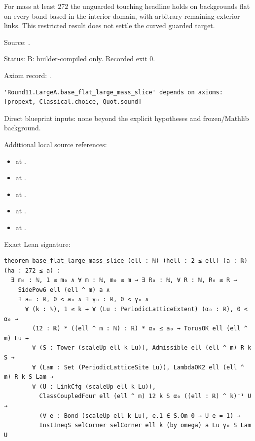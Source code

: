 \begin{theorem}[bp-238]
\label{bp-238}
\uses{}
\leanok
For mass at least 272 the unguarded touching headline holds on backgrounds flat on every bond based in the interior domain, with arbitrary remaining exterior links. This restricted result does not settle the curved guarded target.

\par Source: \texttt{}.
\par Status: B: builder-compiled only. Recorded exit 0.
\par Axiom record: \texttt{}.
\begin{verbatim}
'Round11.LargeA.base_flat_large_mass_slice' depends on axioms: [propext, Classical.choice, Quot.sound]
\end{verbatim}
\par Direct blueprint inputs: none beyond the explicit hypotheses and frozen/Mathlib background.
\par Additional local source references:
\begin{itemize}
\item \texttt{} at \texttt{}.
\item \texttt{} at \texttt{}.
\item \texttt{} at \texttt{}.
\item \texttt{} at \texttt{}.
\item \texttt{} at \texttt{}.
\end{itemize}
\par Exact Lean signature:
\begin{verbatim}
theorem base_flat_large_mass_slice (ell : ℕ) (hell : 2 ≤ ell) (a : ℝ) (ha : 272 ≤ a) :
  ∃ m₀ : ℕ, 1 ≤ m₀ ∧ ∀ m : ℕ, m₀ ≤ m → ∃ R₀ : ℕ, ∀ R : ℕ, R₀ ≤ R →
    SidePow6 ell (ell ^ m) a ∧
    ∃ a₀ : ℝ, 0 < a₀ ∧ ∃ γ₀ : ℝ, 0 < γ₀ ∧
      ∀ (k : ℕ), 1 ≤ k → ∀ (Lu : PeriodicLatticeExtent) (α₀ : ℝ), 0 < α₀ →
        (12 : ℝ) * ((ell ^ m : ℕ) : ℝ) * α₀ ≤ a₀ → TorusOK ell (ell ^ m) Lu →
        ∀ (S : Tower (scaleUp ell k Lu)), Admissible ell (ell ^ m) R k S →
        ∀ (Lam : Set (PeriodicLatticeSite Lu)), LambdaOK2 ell (ell ^ m) R k S Lam →
        ∀ (U : LinkCfg (scaleUp ell k Lu)),
          ClassCoupledFour ell (ell ^ m) 12 k S α₀ ((ell : ℝ) ^ k)⁻¹ U →
          (∀ e : Bond (scaleUp ell k Lu), e.1 ∈ S.Om 0 → U e = 1) →
          InstIneqS selCorner selCorner ell k (by omega) a Lu γ₀ S Lam U
\end{verbatim}
\end{theorem}


